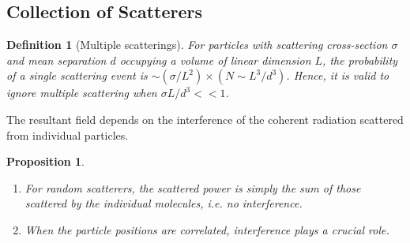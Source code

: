 \documentclass[a4paper]{article}
\theoremstyle{new}
\newtheorem{defi}{Definition}[section]
\newtheorem{prop}{Proposition}[section]
\begin{document}
\subsection{Collection of Scatterers}
\begin{defi}[Multiple scatterings]
For particles with scattering cross-section $\sigma$ and mean separation $d$ occupying a volume of linear dimension $L$, the probability of a single scattering event is $\sim(\sigma/L^2)\times (N\sim L^3/d^3)$. Hence, it is valid to ignore multiple scattering when $\sigma L/d^3<<1$.
\end{defi}
The resultant field depends on the interference of the coherent radiation scattered from individual particles.
\begin{prop}\leavevmode
\begin{enumerate}
    \item For random scatterers, the scattered power is simply the sum of those scattered by the individual molecules, i.e. no interference.
    \item When the particle positions are correlated, interference plays a crucial role.
\end{enumerate}
\end{prop}
\end{document}
